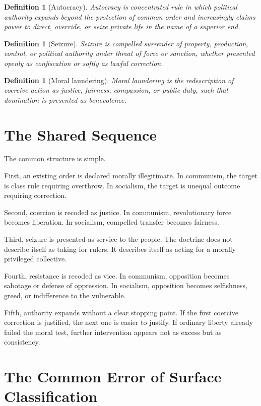 \documentclass[12pt,letterpaper]{article}
\newtheorem{definition}[proposition]{Definition}
\begin{document}
\begin{definition}[Autocracy]
Autocracy is concentrated rule in which political authority expands beyond the protection of
common order and increasingly claims power to direct, override, or seize private life in the
name of a superior end.
\end{definition}

\begin{definition}[Seizure]
Seizure is compelled surrender of property, production, control, or political authority under
threat of force or sanction, whether presented openly as confiscation or softly as lawful
correction.
\end{definition}

\begin{definition}[Moral laundering]
Moral laundering is the redescription of coercive action as justice, fairness, compassion, or
public duty, such that domination is presented as benevolence.
\end{definition}

\section{The Shared Sequence}

The common structure is simple.

First, an existing order is declared morally illegitimate. In communism, the target is class
rule requiring overthrow. In socialism, the target is unequal outcome requiring correction.

Second, coercion is recoded as justice. In communism, revolutionary force becomes liberation.
In socialism, compelled transfer becomes fairness.

Third, seizure is presented as service to the people. The doctrine does not describe itself as
taking for rulers. It describes itself as acting for a morally privileged collective.

Fourth, resistance is recoded as vice. In communism, opposition becomes sabotage or defense
of oppression. In socialism, opposition becomes selfishness, greed, or indifference to the
vulnerable.

Fifth, authority expands without a clear stopping point. If the first coercive correction is
justified, the next one is easier to justify. If ordinary liberty already failed the moral test,
further intervention appears not as excess but as consistency.

\section{The Common Error of Surface Classification}
\end{document}
